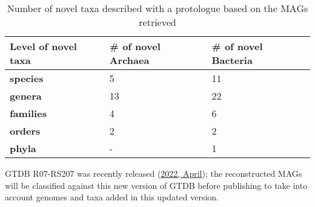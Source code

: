     \begin{table}[h]
        \centering
        \begin{tabular}{lll}
        \hline
        \textbf{Level of novel taxa} & \multicolumn{1}{l|}{\textbf{\# of novel Archaea}} & \multicolumn{1}{l|}{\textbf{\# of novel Bacteria}} \\ \hline
        \textbf{species} & 5 & 11 \\ 
        \textbf{genera} & 13 & 22 \\ 
        \textbf{families} & 4 & 6 \\ 
        \textbf{orders} & 2 & 2 \\
        \textbf{phyla} & - & 1 \\ \cline{1-3}
        \end{tabular}
        \caption{Number of novel taxa described with a protologue based on the MAGs retrieved}
        \label{table:C1}
    \end{table}


    GTDB R07-RS207 was recently released (\href{https://forum.gtdb.ecogenomic.org/t/announcing-gtdb-r07-rs207/264}{2022, April}); 
    the reconstructed MAGs will be 
    classified against this new version of GTDB before publishing 
    to take into account genomes and taxa added in this updated version. 

